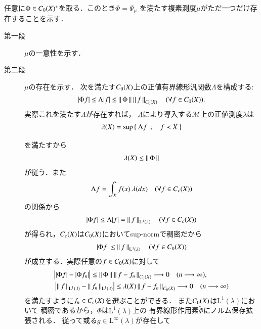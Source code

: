 	\begin{prf}
		任意に$\Phi \in C_0 (X)^*$を取る．このとき$\Phi = \Psi_\mu$
		を満たす複素測度$\mu$がただ一つだけ存在することを示す．
		\begin{description}
			\item[第一段] $\mu$の一意性を示す．
			\item[第二段] $\mu$の存在を示す．
				次を満たす$C_0 (X)$上の正値有界線形汎関数$\Lambda$を構成する:
				\begin{align}
					|\Phi f| \leq \Lambda |f| \leq \left\|\, \Phi\, \right\|_{} \left\|\, f\, \right\|_{C_0 (X)}
					\quad (\forall f \in C_0 (X)).
				\end{align}
				実際これを満たす$\Lambda$が存在すれば，
				$\Lambda$により導入する$\mathcal{M}$上の正値測度$\lambda$は
				\begin{align}
					\lambda(X)
					= \operatorname*{sup}_{} \left\{\ \Lambda f\ \, ; \quad f \prec X\ \right\}
				\end{align}
				を満たすから
				\begin{align}
					\lambda(X) \leq \left\|\, \Phi\, \right\|_{}
				\end{align}
				が従う．また
				\begin{align}
					\Lambda f = \int_X f(x)\ \lambda(dx)
					\quad (\forall f \in C_c (X))
				\end{align}
				の関係から
				\begin{align}
					|\Phi f| \leq \Lambda |f| = \left\|\, f\, \right\|_{\mathrm{L}^1(\lambda)}
					\quad (\forall f \in C_c (X))
				\end{align}
				が得られ，$C_c (X)$は$C_0 (X)$においてsup-normで稠密だから
				\begin{align}
					|\Phi f| \leq \left\|\, f\, \right\|_{\mathrm{L}^1(\lambda)}
					\quad (\forall f \in C_0 (X))
				\end{align}
				が成立する．実際任意の$f \in C_0 (X)$に対して
				\begin{align}
					&\bigl| |\Phi f| - |\Phi f_n| \bigr|
					\leq \left\|\, \Phi\, \right\|_{} \left\|\, f - f_n\, \right\|_{C_0 (X)}
					\longrightarrow 0 \quad (n \longrightarrow \infty), \\
					&\left| \left\|\, f\, \right\|_{\mathrm{L}^1(\lambda)} - \left\|\, f_n\, \right\|_{\mathrm{L}^1(\lambda)} \right| \leq \lambda(X) \left\|\, f - f_n\, \right\|_{C_0 (X)}
					\longrightarrow 0 \quad (n \longrightarrow \infty)
				\end{align}
				を満たすように$f_n \in C_c (X)$を選ぶことができる．
				また$C_0 (X)$は$\mathrm{L}^1(\lambda)$において
				稠密であるから，$\Phi$は$\mathrm{L}^1(\lambda)$上の
				有界線形作用素$\tilde{\Phi}$にノルム保存拡張される．
				従って或る$g \in \mathrm{L}^\infty(\lambda)$が存在して

\end{description}
\end{prf}
